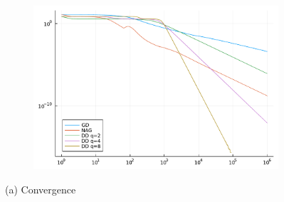 \begin{figure}[htbp]
\begin{subfigure}{0.4\textwidth}
        \caption{}
        \label{l4}
    \end{subfigure}
    \hfill
    \begin{subfigure}{0.4\textwidth}
        \includegraphics[width=\textwidth]{"assets/logistic.pdf"}
        \caption{}
        \label{fig:logistic}
    \end{subfigure}
    \caption{(a) Convergence}
    \label{Numerical}
\end{figure}